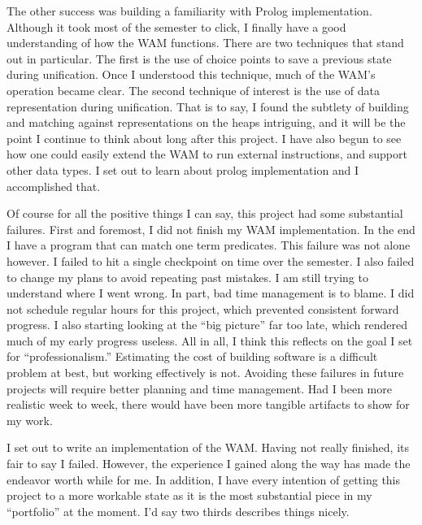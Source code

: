 \documentclass{article}
\begin{document}
The other success was building a familiarity with Prolog implementation. Although it took most of the semester to click, I finally have a good understanding of how the WAM functions. There are two techniques that stand out in particular. The first is the use of choice points to save a previous state during unification. Once I understood this technique, much of the WAM's operation became clear. The second technique of interest is the use of data representation during unification. That is to say, I found the subtlety of building and matching against representations on the heaps intriguing, and it will be the point I continue to think about long after this project. I have also begun to see how one could easily extend the WAM to run external instructions, and support other data types. I set out to learn about prolog implementation and I accomplished that.

Of course for all the positive things I can say, this project had some substantial failures. First and foremost, I did not finish my WAM implementation. In the end I have a program that can match one term predicates. This failure was not alone however. I failed to hit a single checkpoint on time over the semester. I also failed to change my plans to avoid repeating past mistakes. I am still trying to understand where I went wrong. In part, bad time management is to blame. I did not schedule regular hours for this project, which prevented consistent forward progress. I also starting looking at the ``big picture'' far too late, which rendered much of my early progress useless. All in all, I think this reflects on the goal I set for ``professionalism.'' Estimating the cost of building software is a difficult problem at best, but working effectively is not. Avoiding these failures in future projects will require better planning and time management. Had I been more realistic week to week, there would have been more tangible artifacts to show for my work.

I set out to write an implementation of the WAM. Having not really finished, its fair to say I failed. However, the experience I gained along the way has made the endeavor worth while for me. In addition, I have every intention of getting this project to a more workable state as it is the most substantial piece in my ``portfolio'' at the moment. I'd say two thirds describes things nicely.
\end{document}
